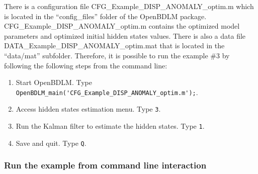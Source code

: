 There is a configuration file CFG\_Example\_DISP\_ANOMALY\_optim.m which is located in the ``config\_files'' folder of the OpenBDLM package.
CFG\_Example\_DISP\_ANOMALY\_optim.m contains the optimized model parameters and optimized initial hidden states values.
There is also a data file DATA\_Example\_DISP\_ANOMALY\_optim.mat that is located in the ``data/mat'' subfolder.
Therefore, it is possible to run the example \#3 by following the following steps from the \MATLAB{} command line:
\begin{enumerate}
\item Start OpenBDLM. Type \colorbox{light-gray}{\lstinline[basicstyle = \mlttfamily \small, backgroundcolor = \color{light-gray}]!OpenBDLM_main('CFG_Example_DISP_ANOMALY_optim.m');!}.
\item Access hidden states estimation menu. Type \colorbox{light-gray}{\lstinline[basicstyle = \mlttfamily \small, backgroundcolor = \color{light-gray}]!3!}.
\item Run the Kalman filter to estimate the hidden states. Type \colorbox{light-gray}{\lstinline[basicstyle = \mlttfamily \small, backgroundcolor = \color{light-gray}]!1!}.
\item Save and quit. Type \colorbox{light-gray}{\lstinline[basicstyle = \mlttfamily \small, backgroundcolor = \color{light-gray}]!Q!}.
\end{enumerate}


\subsubsection{Run the example from command line interaction}

